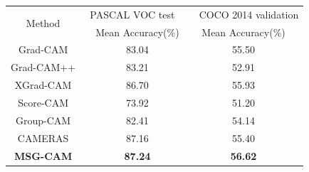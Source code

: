 \begin{table}
	\renewcommand{\arraystretch}{1.5}
	\centering
	\wuhao

	\begin{tabular}{ccccccc} %
		\toprule[1.5pt] %
		\multicolumn{2}{c}{\multirow{2}{*}{Method}}& \multicolumn{2}{c}{PASCAL VOC test}&&\multicolumn{2}{c}{COCO 2014 validation}\\
		\multicolumn{2}{c}{}&&Mean Accuracy($\%$)&&Mean Accuracy($\%$)&\\  %
		\hline %
		\multicolumn{2}{c}{Grad-CAM}&   &83.04&    &55.50&    \\   %
		\multicolumn{2}{c}{Grad-CAM++}&   &83.21&    &52.91&   \\
		\multicolumn{2}{c}{XGrad-CAM}&   &86.70&    &55.93&   \\
		\multicolumn{2}{c}{Score-CAM}&   &73.92&   &51.20&   \\
		\multicolumn{2}{c}{Group-CAM}&   &82.41&  &54.14&   \\
		\multicolumn{2}{c}{CAMERAS}&   &87.16&    &55.40&   \\
		\multicolumn{2}{c}{\textbf{MSG-CAM}}&   &\textbf{87.24}&   &\textbf{56.62}&   \\
		\bottomrule[1.5pt] %
	\end{tabular}

	\label{point}
\end{table}

